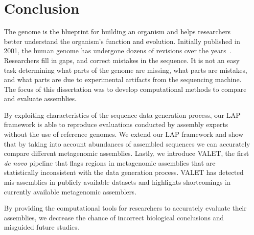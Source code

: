
\renewcommand{\thechapter}{7}

\chapter{Conclusion}

The genome is the blueprint for building an organism and helps researchers better understand the organism's function and evolution.
Initially published in 2001, the human genome has undergone dozens of revisions over the years~\cite{monya2012}.
Researchers fill in gaps, and correct mistakes in the sequence.
It is not an easy task determining what parts of the genome are missing, what parts are mistakes, and what parts are due to experimental artifacts from the sequencing machine.
The focus of this dissertation was to develop computational methods to compare and evaluate assemblies.

By exploiting characteristics of the sequence data generation process, our LAP framework is able to reproduce evaluations conducted by assembly experts without the use of reference genomes.
We extend our LAP framework and show that by taking into account abundances of assembled sequences we can accurately compare different metagenomic assemblies.
Lastly, we introduce VALET, the first \emph{de novo} pipeline that flags regions in metagenomic assemblies that are statistically inconsistent with the data generation process.
VALET has detected mis-assemblies in publicly available datasets and highlights shortcomings in currently available metagenomic assemblers.

By providing the computational tools for researchers to accurately evaluate their assemblies, we decrease the chance of incorrect biological conclusions and misguided future studies.


